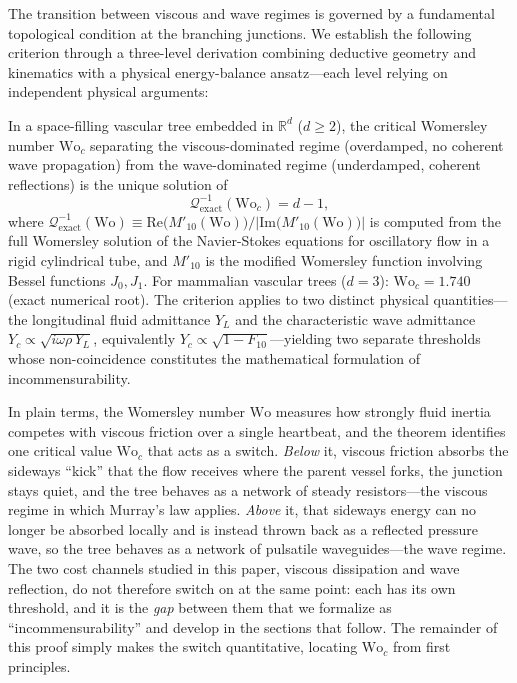 The transition between viscous and wave regimes is governed by a fundamental
topological condition at the branching junctions. We establish the following
criterion through a three-level derivation combining deductive geometry and
kinematics with a physical energy-balance ansatz---each level relying on
independent physical arguments:

\begin{theorem}
\label{thm:kinematic_matching}
In a space-filling vascular tree embedded in $\mathbb{R}^d$ ($d \ge 2$), the
critical Womersley number $\mathrm{Wo}_c$ separating the viscous-dominated
regime (overdamped, no coherent wave propagation) from the wave-dominated regime
(underdamped, coherent reflections) is the unique solution of
\begin{equation}
\mathcal{Q}^{-1}_{\mathrm{exact}}(\mathrm{Wo}_c) = d - 1,
\label{eq:kinematic_matching_exact}
\end{equation}
where $\mathcal{Q}^{-1}_{\mathrm{exact}}(\mathrm{Wo}) \equiv
\mathrm{Re}\bigl(M'_{10}(\mathrm{Wo})\bigr) \big/
\bigl|\mathrm{Im}\bigl(M'_{10}(\mathrm{Wo})\bigr)\bigr|$ is computed from the
full Womersley solution of the Navier-Stokes equations for oscillatory flow in a
rigid cylindrical tube, and $M'_{10}$ is the modified Womersley function
involving Bessel functions $J_0, J_1$. For mammalian vascular trees ($d=3$):
$\mathrm{Wo}_c = 1.740$ (exact numerical root). The criterion applies to two
distinct physical quantities---the longitudinal fluid admittance $Y_L$ and the
characteristic wave admittance $Y_c \propto \sqrt{i\omega\rho\,Y_L}$,
equivalently $Y_c\propto\sqrt{1-F_{10}}$---yielding two separate thresholds
whose non-coincidence constitutes the mathematical formulation of
incommensurability.
\end{theorem}

In plain terms, the Womersley number $\mathrm{Wo}$ measures how strongly
fluid inertia competes with viscous friction over a single heartbeat, and the
theorem identifies one critical value $\mathrm{Wo}_c$ that acts as a switch.
\emph{Below} it, viscous friction absorbs the sideways ``kick'' that the flow
receives where the parent vessel forks, the junction stays quiet, and the tree
behaves as a network of steady resistors---the viscous regime in which Murray's
law applies. \emph{Above} it, that sideways energy can no longer be absorbed
locally and is instead thrown back as a reflected pressure wave, so the tree
behaves as a network of pulsatile waveguides---the wave regime. The two cost
channels studied in this paper, viscous dissipation and wave reflection, do not
therefore switch on at the same point: each has its own threshold, and it is the
\emph{gap} between them that we formalize as ``incommensurability'' and develop
in the sections that follow. The remainder of this proof simply makes the switch
quantitative, locating $\mathrm{Wo}_c$ from first principles.

